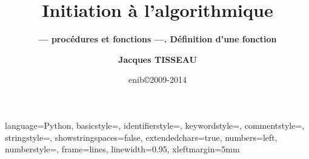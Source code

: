 


\newtheorem{rem}{Remarque}[section]
\newtheorem{defin}{Définition}[section]
\newtheorem{td}{\color{blue}TD}[section]

\lstset
{
language=Python,
basicstyle=\ttfamily,
identifierstyle=\ttfamily,
keywordstyle=\color{blue}\ttfamily,
commentstyle=\color{gray}\ttfamily,
stringstyle=\color{green}\ttfamily,
showstringspaces=false,
extendedchars=true,
numbers=left, 
numberstyle=\tiny,
frame=lines,
linewidth=0.95\textwidth,
xleftmargin=5mm
} 

\def\exo#1{\mbox{}\ \hfill\mbox{\color{blue}$\rule{2mm}{2mm}\,$\footnotesize\sc TD\ref{#1}}}
\def\exercice#1#2{\mbox{}\ \ TD \ref{#1}\ #2\ \dotfill\ \pageref{#1}\mbox{}}

\newenvironment{py}[1]{\begin{minipage}[t]{#1}\footnotesize}{\end{minipage}}

\graphicspath{{../../fig/}}


\title[Algorithmique]{\bf Initiation à l'algorithmique}
\subtitle{\bf --- procédures et fonctions ---. Définition d'une fonction}

\author[\tt jacques.tisseau@enib.fr]{\large\bf Jacques TISSEAU}
\institute[\enib]{{\large\enib--\cerv}}
\date[enib\copyright 2009-2014]{\footnotesize enib\copyright 2009-2014}


